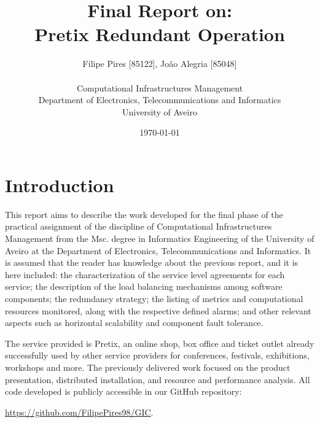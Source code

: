 \documentclass[12pt]{article}
\title{Final Report on:\\Pretix Redundant Operation}
\author
{Filipe Pires [85122], João Alegria [85048]\\
\\
Computational Infrastructures Management\\
\normalsize{Department of Electronics, Telecommunications and Informatics}\\
\normalsize{University of Aveiro}\\
}
\date{\today{}}
\begin{document}
\baselineskip18pt

\maketitle

\section*{Introduction} \label{introduction} %

This report aims to describe the work developed for the final phase of the practical assignment of the discipline of Computational Infrastructures
Management \cite{assign} from the Msc. degree in Informatics Engineering of the University of Aveiro at the Department of Electronics, Telecommunications and
Informatics.
It is assumed that the reader has knowledge about the previous report, and it is here included:
the characterization of the service level agreements for each service;
the description of the load balancing mechanisms among software components;
the redundancy strategy;
the listing of metrics and computational resources monitored, along with the respective defined alarms;
and other relevant aspects such as horizontal scalability and component fault tolerance.

The service provided is Pretix, an online shop, box office and ticket outlet already successfully used by other service providers for conferences, festivals,
exhibitions, workshops and more.
The previously delivered work focused on the product presentation, distributed installation, and resource and performance analysis.
All code developed is publicly accessible in our GitHub repository:

\url{https://github.com/FilipePires98/GIC}.



\end{document}
